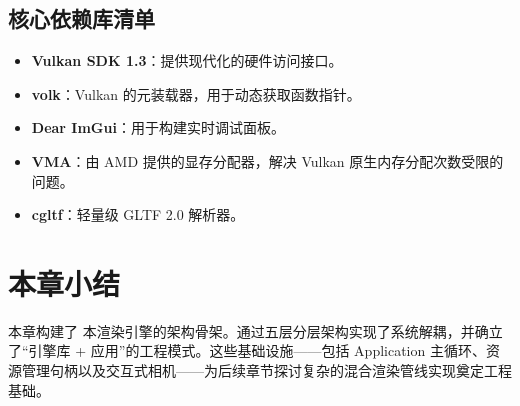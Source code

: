 \subsection{核心依赖库清单}
\begin{itemize}
    \item \textbf{Vulkan SDK 1.3}：提供现代化的硬件访问接口。
    \item \textbf{volk}：Vulkan 的元装载器，用于动态获取函数指针。
    \item \textbf{Dear ImGui}：用于构建实时调试面板。
    \item \textbf{VMA}：由 AMD 提供的显存分配器，解决 Vulkan 原生内存分配次数受限的问题。
    \item \textbf{cgltf}：轻量级 GLTF 2.0 解析器。
\end{itemize}

\section{本章小结}
本章构建了 本渲染引擎的架构骨架。通过五层分层架构实现了系统解耦，并确立了“引擎库 + 应用”的工程模式。这些基础设施——包括 Application 主循环、资源管理句柄以及交互式相机——为后续章节探讨复杂的混合渲染管线实现奠定工程基础。
